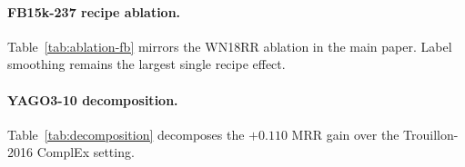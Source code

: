 \paragraph{FB15k-237 recipe ablation.}
Table~\ref{tab:ablation-fb} mirrors the WN18RR ablation in the main paper. Label smoothing remains the largest single recipe effect.

\begin{table}[H]
\centering
\caption{FB15k-237 training-recipe ablation. 3 seeds where indicated; 1 seed otherwise.}
\label{tab:ablation-fb}
\footnotesize
\setlength{\tabcolsep}{2.5pt}
\end{table}

\paragraph{YAGO3-10 decomposition.}
Table~\ref{tab:decomposition} decomposes the $+0.110$ MRR gain over the Trouillon-2016 ComplEx setting.

\begin{table}[H]
\centering
\caption{Recipe decomposition on YAGO3-10. Leave-one-out from our best configuration; ``$\to$ original'' uses the Trouillon-2016 ComplEx setting~\citep{complex}.}
\label{tab:decomposition}
\footnotesize
\setlength{\tabcolsep}{3pt}
\end{table}

